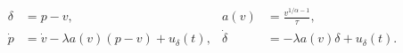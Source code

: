 \documentclass[12pt]{article}
\begin{document}
\fontsize{22}{28}\selectfont\[\begin{aligned}\delta&=p-v,&a(v)&=\frac{v^{1/\alpha-1}}{\tau},\\\dot p&=\dot v-\lambda a(v)(p-v)+u_\delta(t),&\dot\delta&=-\lambda a(v)\delta+u_\delta(t).\end{aligned}\]
\end{document}

